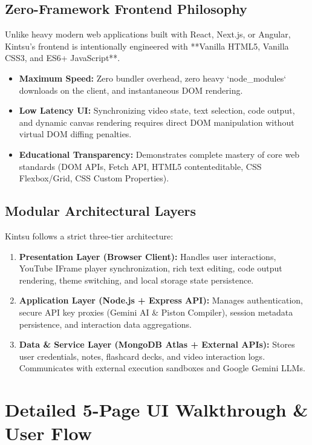 \documentclass[12pt,a4paper]{article}
\begin{document}
\subsection{Zero-Framework Frontend Philosophy}
Unlike heavy modern web applications built with React, Next.js, or Angular, Kintsu’s frontend is intentionally engineered with **Vanilla HTML5, Vanilla CSS3, and ES6+ JavaScript**.
\begin{itemize}[leftmargin=1.2cm]
    \item \textbf{Maximum Speed:} Zero bundler overhead, zero heavy `node_modules` downloads on the client, and instantaneous DOM rendering.
    \item \textbf{Low Latency UI:} Synchronizing video state, text selection, code output, and dynamic canvas rendering requires direct DOM manipulation without virtual DOM diffing penalties.
    \item \textbf{Educational Transparency:} Demonstrates complete mastery of core web standards (DOM APIs, Fetch API, HTML5 contenteditable, CSS Flexbox/Grid, CSS Custom Properties).
\end{itemize}

\subsection{Modular Architectural Layers}
Kintsu follows a strict three-tier architecture:
\begin{enumerate}[leftmargin=1.2cm]
    \item \textbf{Presentation Layer (Browser Client):} Handles user interactions, YouTube IFrame player synchronization, rich text editing, code output rendering, theme switching, and local storage state persistence.
    \item \textbf{Application Layer (Node.js + Express API):} Manages authentication, secure API key proxies (Gemini AI \& Piston Compiler), session metadata persistence, and interaction data aggregations.
    \item \textbf{Data \& Service Layer (MongoDB Atlas + External APIs):} Stores user credentials, notes, flashcard decks, and video interaction logs. Communicates with external execution sandboxes and Google Gemini LLMs.
\end{enumerate}

\section{Detailed 5-Page UI Walkthrough \& User Flow}
\end{document}
